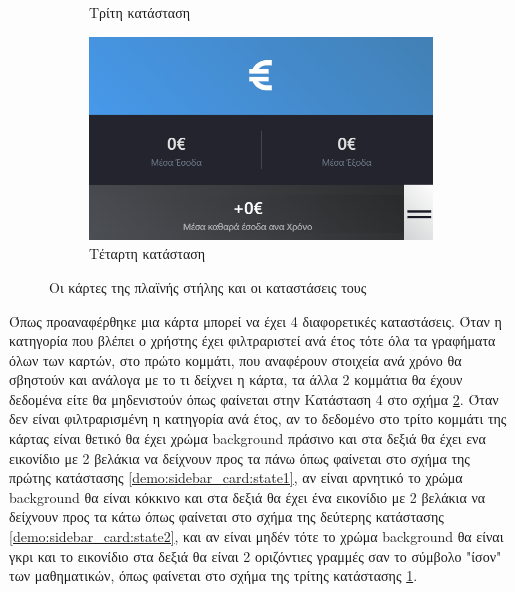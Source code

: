 \begin{figure}[h]
\begin{subfigure}[b]{0.475\textwidth}
        \caption{Τρίτη κατάσταση}
        \label{demo:sidebar_card:state3}
    \end{subfigure}
    \hfill
    \begin{subfigure}[b]{0.475\textwidth}   
        \centering 
        \includegraphics[width=\textwidth]{Chapters/6 - Manual/Images/main_page_sidebar_card_state4.png}
        \caption{Τέταρτη κατάσταση}
        \label{demo:sidebar_card:state4}
    \end{subfigure}
    \caption{Οι κάρτες της πλαϊνής στήλης και οι καταστάσεις τους}
    \label{demo:sidebar_card}
\end{figure}

Όπως προαναφέρθηκε μια κάρτα μπορεί να έχει 4 διαφορετικές καταστάσεις. Όταν η κατηγορία που βλέπει ο χρήστης έχει φιλτραριστεί ανά έτος τότε όλα τα γραφήματα όλων των καρτών, στο πρώτο κομμάτι, που αναφέρουν στοιχεία ανά χρόνο θα σβηστούν και ανάλογα με το τι δείχνει η κάρτα, τα άλλα 2 κομμάτια θα έχουν δεδομένα είτε θα μηδενιστούν όπως φαίνεται στην Κατάσταση 4 στο σχήμα \ref{demo:sidebar_card:state4}. Όταν δεν είναι φιλτραρισμένη η κατηγορία ανά έτος, αν το δεδομένο στο τρίτο κομμάτι της κάρτας είναι θετικό θα έχει χρώμα background πράσινο και στα δεξιά θα έχει ενα εικονίδιο με 2 βελάκια να δείχνουν προς τα πάνω όπως φαίνεται στο σχήμα της πρώτης κατάστασης \ref{demo:sidebar_card:state1}, αν είναι αρνητικό το χρώμα background θα είναι κόκκινο και στα δεξιά θα έχει ένα εικονίδιο με 2 βελάκια να δείχνουν προς τα κάτω όπως φαίνεται στο σχήμα της δεύτερης κατάστασης \ref{demo:sidebar_card:state2}, και αν είναι μηδέν τότε το χρώμα background θα είναι γκρι και το εικονίδιο στα δεξιά θα είναι 2 οριζόντιες γραμμές σαν το σύμβολο "ίσον" των μαθηματικών, όπως φαίνεται στο σχήμα της τρίτης κατάστασης \ref{demo:sidebar_card:state3}.

